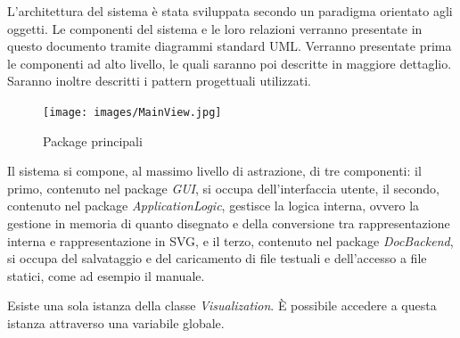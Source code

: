 L'architettura del sistema \`e stata sviluppata secondo un paradigma orientato agli oggetti. Le componenti del sistema e le loro relazioni verranno presentate in questo documento tramite diagrammi standard UML. Verranno presentate prima le componenti ad alto livello, le quali saranno poi descritte in maggiore dettaglio. Saranno inoltre descritti i pattern progettuali utilizzati.

\begin{figure}[!ht]
\centering
\texttt{[image: images/MainView.jpg]}
\caption{Package principali}
\end{figure}

Il sistema si compone, al massimo livello di astrazione, di tre componenti: il primo, contenuto nel package \textit{GUI}, si occupa dell'interfaccia utente, il secondo, contenuto nel package \textit{ApplicationLogic}, gestisce la logica interna, ovvero la gestione in memoria di quanto disegnato e della conversione tra rappresentazione interna e rappresentazione in SVG, e il terzo, contenuto nel package \textit{DocBackend}, si occupa del salvataggio e del caricamento di file testuali e dell'accesso a file statici, come ad esempio il manuale.
\newpage
{}

Esiste una sola istanza della classe \textit{Visualization}. \`E possibile accedere a questa istanza attraverso una variabile globale.

